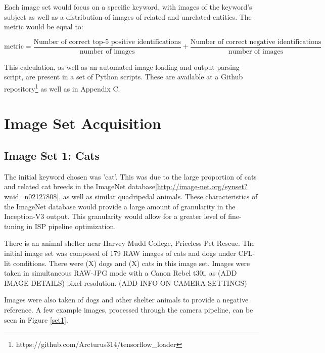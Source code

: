 \documentclass{report}
\begin{document}
		Each image set would focus on a specific keyword, with images of the keyword's subject as well as a distribution of images of related and unrelated entities. The metric would be equal to:
		
		\begin{equation*}
			\text{metric}=\frac{\text{Number of correct top-5 positive identifications}}{\text{number of images}} + \frac{\text{Number of correct negative identifications}}{\text{number of images}}
		\end{equation*}
		
		This calculation, as well as an automated image loading and output parsing script, are present in a set of Python scripts. These are available at a Github repository\footnote{https://github.com/Arcturus314/tensorflow\_loader} as well as in Appendix C.
	\section{Image Set Acquisition}
		\subsection{Image Set 1: Cats}
		The initial keyword chosen was 'cat'. This was due to the large proportion of cats and related cat breeds in the ImageNet database\ref{http://image-net.org/synset?wnid=n02127808}, as well as similar quadripedal animals. These characteristics of the ImageNet database would provide a large amount of granularity in the Inception-V3 output. This granularity would allow for a greater level of fine-tuning in ISP pipeline optimization.
		
		There is an animal shelter near Harvey Mudd College, Priceless Pet Rescue\cite{http://pricelesspetrescue.org/}. The initial image set was composed of 179 RAW images of cats and dogs under CFL-lit conditions. There were (X) dogs and (X) cats in this image set. Images were taken in simultaneous RAW-JPG mode with a Canon Rebel t30i, as (ADD IMAGE DETAILS) pixel resolution. (ADD INFO ON CAMERA SETTINGS)
		
		Images were also taken of dogs and other shelter animals to provide a negative reference. A few example images, processed through the camera pipeline, can be seen in Figure \ref{set1}.
		
\end{document}
